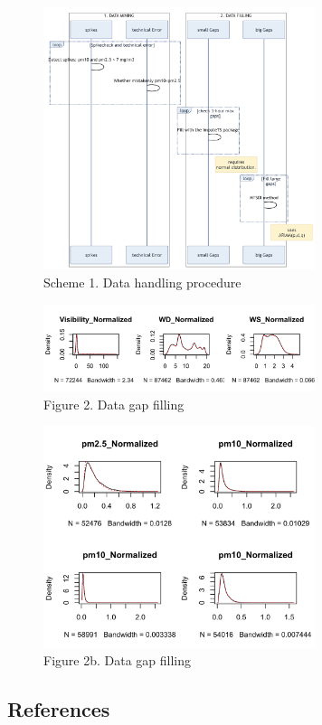 \documentclass[
  11pt,
]{article}
\begin{document}
\newpage

\begin{figure}
\centering
\includegraphics[width=3.125in,height=\textheight,keepaspectratio]{images/scheme_1.png}
\caption{Scheme 1. Data handling procedure}
\end{figure}

\newpage

\begin{figure}
\centering
\includegraphics[width=3.125in,height=\textheight,keepaspectratio]{images/figure_2b.png}
\caption{Figure 2. Data gap filling}
\end{figure}

\begin{figure}
\centering
\includegraphics[width=3.125in,height=\textheight,keepaspectratio]{images/figure_2c.png}
\caption{Figure 2b. Data gap filling}
\end{figure}

\newpage

\subsection{References}\label{references}
\end{document}
